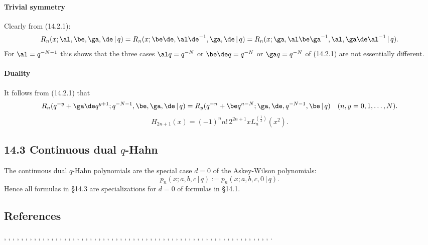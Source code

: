 \documentclass[envcountchap,graybox]{svmono}
\newcounter{rom}
\begin{document}
\paragraph{Trivial symmetry}
Clearly from (14.2.1):
\begin{equation}
R_n(x;\al,\be,\ga,\de\,|\, q)=R_n(x;\be\de,\al\de^{-1},\ga,\de\,|\, q)
=R_n(x;\ga,\al\be\ga^{-1},\al,\ga\de\al^{-1}\,|\, q).
\label{83}
\end{equation}
For $\al=q^{-N-1}$ this shows that the three cases
$\al q=q^{-N}$ or $\be\de q=q^{-N}$ or $\ga q=q^{-N}$ of (14.2.1)
are not essentially different.
%
\paragraph{Duality}
It follows from (14.2.1) that
\begin{equation}
R_n(q^{-y}+\ga\de q^{y+1};q^{-N-1},\be,\ga,\de\,|\, q)
=R_y(q^{-n}+\be q^{n-N};\ga,\de,q^{-N-1},\be\,|\, q)\quad
(n,y=0,1,\ldots,N).
\end{equation}
$$H_{2n+1}(x)=(-1)^nn!\,2^{2n+1}xL_n^{(\frac{1}{2})}(x^2).$$

\subsection*{14.3 Continuous dual $q$-Hahn}
\label{sec14.3}
The continuous dual $q$-Hahn polynomials are the special case $d=0$ of the
Askey-Wilson polynomials:
\[
p_n(x;a,b,c\,|\, q):=p_n(x;a,b,c,0\,|\, q).
\]
Hence all formulas in \S14.3 are specializations for $d=0$ of formulas in \S14.1.
\subsection*{References}
\cite{Abram}, \cite{NAlSalam66}, \cite{AlSalam90}, \cite{AlSalamChihara72},
\cite{AlSalamChihara76}, \cite{AndrewsAskey85}, \cite{AndrewsAskeyRoy}, \cite{Area+I}, 
\cite{Askey68}, \cite{Askey75}, \cite{Askey89I}, \cite{AskeyGasper76}, \cite{AskeyWilson85}, 
\cite{Azor}, \cite{Berg}, \cite{BilodeauII}, \cite{Brafman51}, \cite{Brafman57II}, 
\cite{Brenke}, \cite{CarlitzSrivastava}, \cite{ChenSrivastava}, \cite{Chihara78}, 
\cite{Cohen}, \cite{Danese}, \cite{DetteStudden92}, \cite{DetteStudden95}, \cite{Doha2004I},
\cite{Erdelyi+}, \cite{Faldey}, \cite{Gawronski87}, \cite{Gawronski93}, \cite{Gillis+},
\cite{Godoy+}, \cite{Grad}, \cite{Ismail74}, \cite{Ismail2005II}, \cite{IsmailStanton97},
\cite{Koekoek2000}, \cite{Koorn88}, \cite{Krasikov2004}, \cite{Kwon+}, \cite{LabelleYehIII},
\cite{Lesky95II}, \cite{Lesky96}, \cite{LewanowiczI}, \cite{LopezTemme99}, \cite{Mathai},
\cite{Meixner}, \cite{Nikiforov+}, \cite{NikiforovUvarov}, \cite{Olver}, \cite{Pittaluga},
\cite{Rainville}, \cite{SainteViennot}, \cite{Srivastava71}, \cite{SrivastavaMathur},
\cite{Szego75}, \cite{Temme}, \cite{TemmeLopez2000}, \cite{Trickovic}, \cite{Viennot},
\cite{Weisner59}, \cite{Wyman}.
\end{document}
